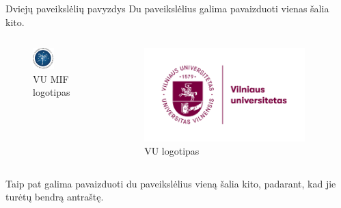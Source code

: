 \documentclass[12pt]{beamer}
\begin{document}
\begin{frame}[allowframebreaks]{Dviejų paveikslėlių pavyzdys}
    Du paveikslėlius galima pavaizduoti vienas šalia kito.
    \begin{columns}[b]
        \begin{figure}
            \centering
            \includegraphics[width=0.5\textwidth]{resources/MIF.png}
            \caption{VU MIF logotipas}
            \label{fig:mif-logo1}
        \end{figure}
        \begin{figure}
            \centering
            \includegraphics[width=0.9\textwidth]{resources/VU_logo_lt.png}
            \caption{VU logotipas}
            \label{fig:vu-logo1}
        \end{figure}
    \end{columns}

\break

Taip pat galima pavaizduoti du paveikslėlius vieną šalia kito, padarant, kad jie turėtų bendrą antraštę.


\end{frame}
\end{document}
